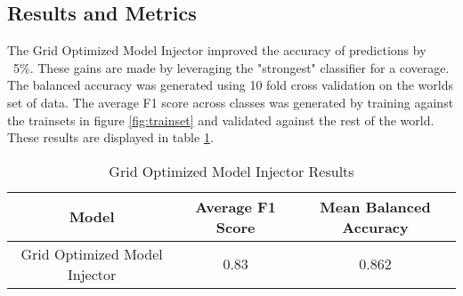 \subsection{Results and Metrics}


The Grid Optimized Model Injector improved the accuracy of predictions by ~5\%.
These gains are made by leveraging the "strongest" classifier for a coverage.
The balanced accuracy was generated using 10 fold cross validation on the worlds set of data.
The average F1 score across classes was generated by training against the trainsets in figure \ref{fig:trainset} and validated against the rest of the world.
These results are displayed in table \ref{table:GRID_OPT_RESULTS}.

\begin{table}[htb]
    \begin{tabular}{|c c c|}
        \hline
        \textbf{Model} & \textbf{Average F1 Score} & \textbf{Mean Balanced Accuracy} \\
		\hline
		Grid Optimized Model Injector & 0.83 & 0.862 \\
		\hline
    \end{tabular}
    \label{table:GRID_OPT_RESULTS}
    \caption{Grid Optimized Model Injector Results}
\end{table}



